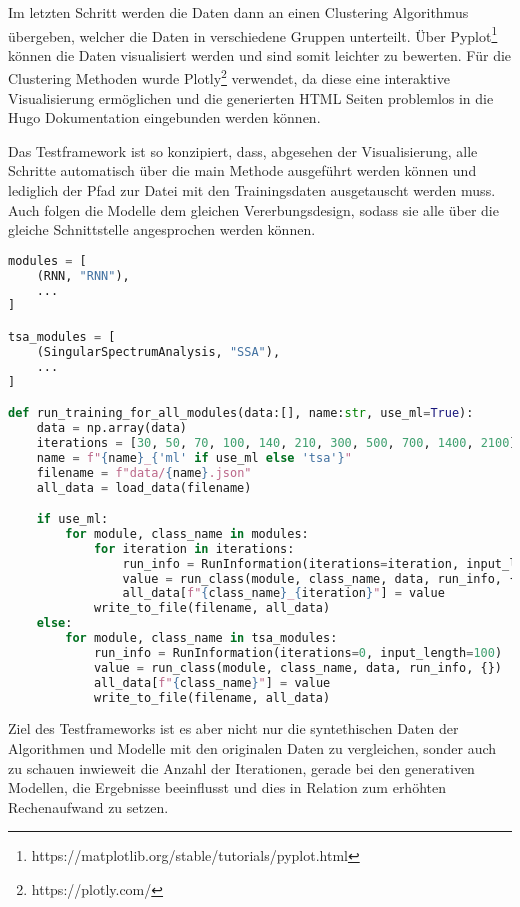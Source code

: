 Im letzten Schritt werden die Daten dann an einen Clustering Algorithmus übergeben, welcher die Daten in verschiedene Gruppen unterteilt.
Über Pyplot\footnote{https://matplotlib.org/stable/tutorials/pyplot.html} können die Daten visualisiert werden und sind somit leichter zu bewerten.
Für die Clustering Methoden wurde Plotly\footnote{https://plotly.com/} verwendet, da diese eine interaktive Visualisierung ermöglichen und die generierten 
HTML Seiten problemlos in die Hugo Dokumentation eingebunden werden können.

Das Testframework ist so konzipiert, dass, abgesehen der Visualisierung, alle Schritte automatisch über die main Methode ausgeführt werden können und lediglich der Pfad zur Datei mit den Trainingsdaten ausgetauscht werden muss.
Auch folgen die Modelle dem gleichen Vererbungsdesign, sodass sie alle über die gleiche Schnittstelle angesprochen werden können.


\begin{lstlisting}[language=Python, caption={Training von Modellen im Testframework}, label={code:modelTraining_test}]
modules = [
    (RNN, "RNN"),
    ...
]

tsa_modules = [
    (SingularSpectrumAnalysis, "SSA"),
    ...
]

def run_training_for_all_modules(data:[], name:str, use_ml=True):
    data = np.array(data)
    iterations = [30, 50, 70, 100, 140, 210, 300, 500, 700, 1400, 2100]
    name = f"{name}_{'ml' if use_ml else 'tsa'}"
    filename = f"data/{name}.json"
    all_data = load_data(filename)

    if use_ml:
        for module, class_name in modules:
            for iteration in iterations:
                run_info = RunInformation(iterations=iteration, input_length=100)
                value = run_class(module, class_name, data, run_info, {})
                all_data[f"{class_name}_{iteration}"] = value
            write_to_file(filename, all_data)
    else:
        for module, class_name in tsa_modules:
            run_info = RunInformation(iterations=0, input_length=100)
            value = run_class(module, class_name, data, run_info, {})
            all_data[f"{class_name}"] = value
            write_to_file(filename, all_data)
\end{lstlisting}

Ziel des Testframeworks ist es aber nicht nur die syntethischen Daten der Algorithmen und Modelle mit den originalen Daten zu vergleichen, 
sonder auch zu schauen inwieweit die Anzahl der Iterationen, gerade bei den generativen Modellen, die Ergebnisse beeinflusst und dies in Relation 
zum erhöhten Rechenaufwand zu setzen.



